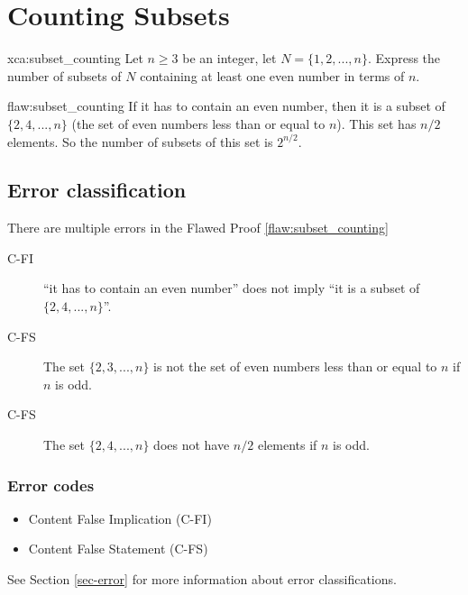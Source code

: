\section{Counting Subsets}

\begin{xca}{xca:subset_counting}
Let $n \geq 3$ be an integer, let $N = \{1, 2, ..., n\}$. Express the number of subsets of $N$ containing at least one even number in terms of $n$. 
\end{xca}

\begin{flaw}{flaw:subset_counting} %
If it has to contain an even number, then it is a subset of $\{2, 4, ..., n\}$ (the set of even numbers less than or equal to $n$). This set has $n/2$ elements. So the number of subsets of this set is $2^{n/2}$. 
\end{flaw}

\clearpage
\subsection{Error classification}


There are multiple errors
 in the Flawed Proof \ref{flaw:subset_counting}
 
 \begin{description}
    \item[C-FI] ``it has to contain an even number'' does not imply  ``it is a subset of $\{2,4,...,n\}$''. 
    \item[C-FS] The set $\{2,3,...,n\}$ is not the set of even numbers less than or equal to $n$ if $n$ is odd. \item[C-FS] The set $\{2,4,...,n\}$ does not have $n/2$ elements if $n$ is odd. 

 	
 \end{description}

 
\subsubsection{Error codes}
\begin{itemize}
    \item Content False Implication (C-FI)
    \item Content False Statement (C-FS)
\end{itemize}
See Section \ref{sec-error} for more information about error classifications.

